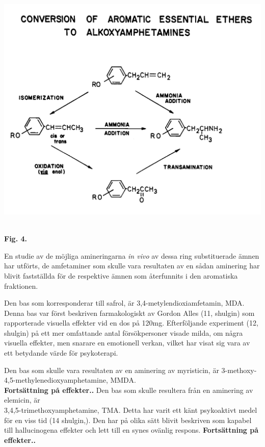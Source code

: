 \documentclass[a4paper,margin=3.25cm]{article}
\begin{document}
{	\hbox{\hspace{0cm}\includegraphics[scale=0.1125]{Figure4}
	}
	\begin{center}\textbf{Fig. 4.}\end{center}


	En studie av de möjliga amineringarna \textit{in vivo} av dessa ring substituerade
	ämnen har utförts, de amfetaminer som skulle vara resultaten av en sådan
	aminering har blivit fastställda för de respektive ämnen som återfunnits
	i den aromatiska fraktionen.

	Den bas som korresponderar till safrol, är 3,4-metylendioxiamfetamin, MDA.
	Denna bas var först beskriven farmakologiskt av Gordon Alles (11, shulgin) som
	rapporterade visuella effekter vid en dos på 120mg. Efterföljande experiment
	(12, shulgin) på ett mer omfattande antal försökpersoner visade milda, om några
	visuella effekter, men snarare en emotionell verkan, vilket har visat sig
	vara av ett betydande värde för psykoterapi.

	Den bas som skulle vara resultaten av en aminering av myristicin, är
	3-methoxy-4,5-methylenedioxyamphetamine, MMDA. \\
	\textbf{Fortsättning på effekter..}
%
	Den bas som skulle resultera från en aminering av elemicin, är \\
	3,4,5-trimethoxyamphetamine, TMA. Detta har varit ett känt psykoaktivt medel
	för en viss tid (14 shulgin,).
	Den har på olika sätt blivit beskriven som kapabel till hallucinogena effekter
	och lett till en synes ovänlig respons. \cite{shulgin1995pihkal}
	\textbf{Fortsättning på effekter..}



}
\end{document}
